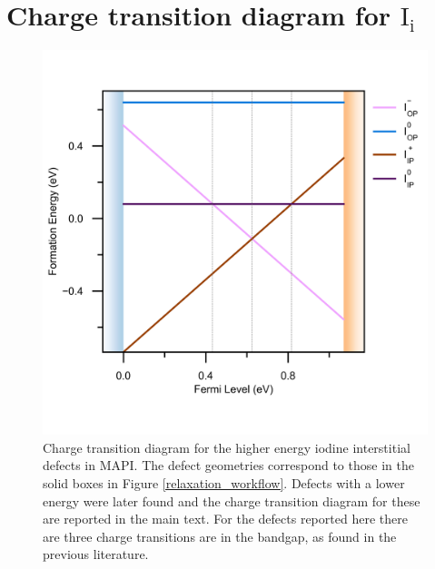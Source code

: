 \chapter{\label{app:7-chargetransition}Charge transition diagram for $\mathrm{I}_\mathrm{i}$}

\begin{figure}[h!]   %
\centering
  \includegraphics[width=0.7\columnwidth]{figures/ap7/charge_transition_HSE_meta.png}
  \caption[Charge transition diagram for higher energy iodine interstitial defects in MAPI]{Charge transition diagram for the higher energy iodine interstitial defects in MAPI. The defect geometries correspond to those in the solid boxes in Figure \ref{relaxation_workflow}. Defects with a lower energy were later found and the charge transition diagram for these are reported in the main text. For the defects reported here there are three charge transitions are in the bandgap, as found in the previous literature.\autocite{Du2015,Meggiolaro2018}}
\label{charge_transition_meta}
\end{figure}